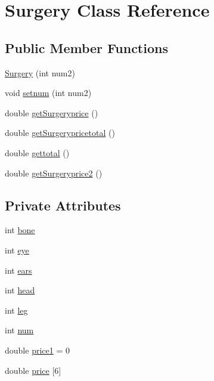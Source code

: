 \hypertarget{class_surgery}{}\section{Surgery Class Reference}
\label{class_surgery}
\subsection*{Public Member Functions}
\begin{DoxyCompactItemize}
\item 
\mbox{\hyperlink{class_surgery_ae376283f188fd75ec5a2947bdcc56986}{Surgery}} (int num2)
\item 
void \mbox{\hyperlink{class_surgery_a8fdc1b9a5eb5fc5bcd8b61f169f2e4ec}{setnum}} (int num2)
\item 
double \mbox{\hyperlink{class_surgery_a6db6501d78eff0c3e1ad401d05368dfc}{get\+Surgeryprice}} ()
\item 
double \mbox{\hyperlink{class_surgery_a1f4a111498f7852cb0d20a3506463d98}{get\+Surgerypricetotal}} ()
\item 
double \mbox{\hyperlink{class_surgery_ad8554eac6e0afe051a2fc0e3c32ea296}{gettotal}} ()
\item 
double \mbox{\hyperlink{class_surgery_a2af2f89816594ffd286ad7442b7dd50f}{get\+Surgeryprice2}} ()
\end{DoxyCompactItemize}
\subsection*{Private Attributes}
\begin{DoxyCompactItemize}
\item 
int \mbox{\hyperlink{class_surgery_a977c7f9009edd408e33f7bbdf46d51ec}{bone}}
\item 
int \mbox{\hyperlink{class_surgery_abed3058960b535c272a90c2eee0048a3}{eye}}
\item 
int \mbox{\hyperlink{class_surgery_a598434a0c6712f21a3fbb2ffa8d03746}{ears}}
\item 
int \mbox{\hyperlink{class_surgery_a5be250f51683984736c4124887f647f3}{head}}
\item 
int \mbox{\hyperlink{class_surgery_aa087261940daee0371c924724e766841}{leg}}
\item 
int \mbox{\hyperlink{class_surgery_a53f95bd6143864c3ee719489f9088353}{num}}
\item 
double \mbox{\hyperlink{class_surgery_a93e4e574bc62aa12ca4236c88f6ec3b2}{price1}} = 0
\item 
double \mbox{\hyperlink{class_surgery_a0edac271925672c2896ade9005c11c78}{price}} \mbox{[}6\mbox{]}
\end{DoxyCompactItemize}


